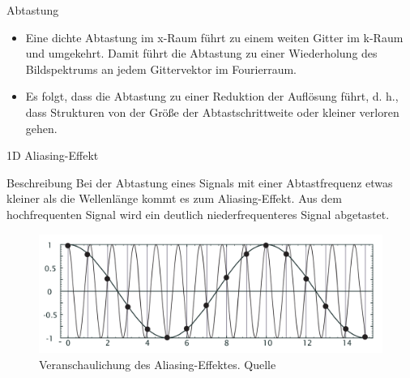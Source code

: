\documentclass{beamer}
\begin{document}
	\begin{frame}{Abtastung}
	\begin{itemize}
		\item Eine dichte Abtastung im x-Raum führt zu einem weiten Gitter im k-Raum und umgekehrt. Damit führt die Abtastung zu einer Wiederholung des Bildspektrums an jedem Gittervektor im Fourierraum.
		\item Es folgt, dass die Abtastung zu einer Reduktion der Auflösung führt, d. h., dass Strukturen von der Größe der Abtastschrittweite oder kleiner verloren gehen.
	\end{itemize}
	
	\end{frame}

	\begin{frame}{1D Aliasing-Effekt}
	\begin{block}{Beschreibung}
		Bei der Abtastung eines Signals mit einer Abtastfrequenz etwas kleiner als die Wellenlänge kommt es zum Aliasing-Effekt. Aus dem hochfrequenten Signal wird ein deutlich niederfrequenteres Signal abgetastet. 
	\end{block}
	
	\begin{figure}
		\includegraphics[width=\textheight]{antialiasing.pdf}
		\caption{\footnotesize Veranschaulichung des Aliasing-Effektes. Quelle\cite{bildverarbeitung}}
	\end{figure}
	
	\end{frame}
\end{document}
